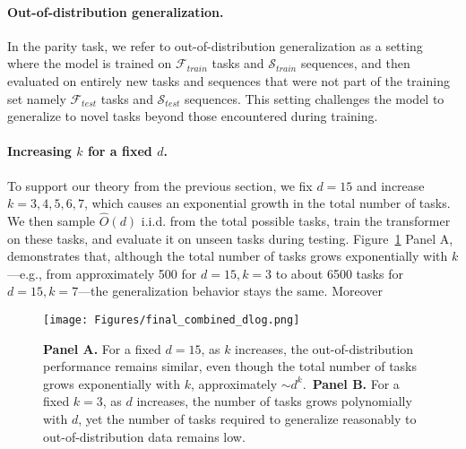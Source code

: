 \paragraph{Out-of-distribution generalization.} In the parity task, we refer to out-of-distribution generalization as a setting where the model is trained on $\mathcal{F}_{train}$ tasks and $\mathcal{S}_{train}$ sequences, and then evaluated on entirely new tasks and sequences that were not part of the training set namely $\mathcal{F}_{test}$ tasks and $\mathcal{S}_{test}$ sequences. This setting challenges the model to generalize to novel tasks beyond those encountered during training.

\paragraph{Increasing $k$ for a fixed $d$.}To support our theory from the previous section, we fix $d=15$ and increase $k=3, 4, 5, 6, 7$, which causes an exponential growth in the total number of tasks. We then sample $\hat{O}(d)$ i.i.d. from the total possible tasks, train the transformer on these tasks, and evaluate it on unseen tasks during testing. Figure~\ref{fig:ood_generalization} Panel A, demonstrates that, although the total number of tasks grows exponentially with $k$---e.g., from approximately 500 for $d=15, k = 3$ to about 6500 tasks for $d=15,k = 7$---the generalization behavior stays the same. Moreover

\begin{figure}[h!]
    \centering
    \texttt{[image: Figures/final\_combined\_dlog.png]}
    \caption{\textbf{Panel A.} For a fixed $d = 15$, as $k$ increases, the out-of-distribution performance remains similar, even though the total number of tasks grows exponentially with $k$, approximately $\sim d^k$.~\textbf{Panel B.} For a fixed $k = 3$, as $d$ increases, the number of tasks grows polynomially with $d$, yet the number of tasks required to generalize reasonably to out-of-distribution data remains low.}




    \label{fig:ood_generalization}
\end{figure}



